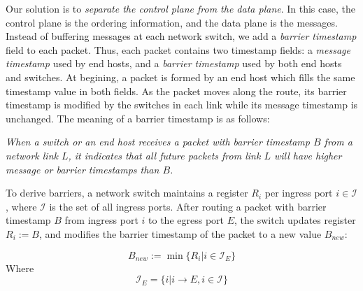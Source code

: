 Our solution is to \textit{separate the control plane from the data plane}. In this case, the control plane is the ordering information, and the data plane is the messages. Instead of buffering messages at each network switch, we add a \textit{barrier timestamp} field to each packet. Thus, each packet contains two timestamp fields: a \textit{message timestamp} used by end hosts, and a \textit{barrier timestamp} used by both end hosts and switches. At begining, a packet is formed by an end host which fills the same timestamp value in both fields. As the packet moves along the route,  its barrier timestamp is modified by the switches in each link while its message timestamp is unchanged. The meaning of a barrier timestamp is as follows: 

\emph{When a switch or an end host receives a packet with barrier timestamp $B$ from a network link $L$, it indicates that all future packets from link $L$ will have higher message or barrier timestamps than $B$.}



To derive barriers, a network switch maintains a register $R_i$ per ingress port $i \in \mathcal{I}$, where $\mathcal{I}$ is the set of all ingress ports. After routing a packet with barrier timestamp $B$ from ingress port $i$ to the egress port $E$, the switch updates register $R_i := B$, and modifies the barrier timestamp of the packet to a new value $B_{new}$:

\begin{equation}\label{equ:derive_barriers}
B_{new}:=\min\{R_i| i\in \mathcal{I}_E\}
\end{equation}
Where 
\begin{equation}\label{equ:derive_barriers1}
\mathcal{I}_E =\{i| i\rightarrow E, i \in \mathcal{I} \}
\end{equation}


